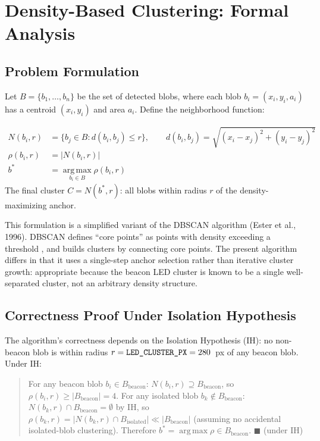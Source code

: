 \section{Density-Based Clustering: Formal Analysis}

\subsection{Problem Formulation}

Let $B=\{b_1,\dots,b_n\}$ be the set of detected blobs, where each blob $b_i=(x_i,y_i,a_i)$ has a centroid $(x_i,y_i)$ and area $a_i$. Define the neighborhood function:

\begin{eqblock}
\begin{align}
N(b_i, r) &= \{ b_j \in B : d(b_i, b_j) \leq r \}, \qquad d(b_i,b_j) = \sqrt{(x_i-x_j)^2+(y_i-y_j)^2} \\
\rho(b_i, r) &= |N(b_i, r)| \\
b^* &= \operatorname*{arg\,max}_{b_i \in B} \rho(b_i, r)
\end{align}
The final cluster $C = N(b^*, r)$: all blobs within radius $r$ of the density-maximizing anchor.
\end{eqblock}

This formulation is a simplified variant of the DBSCAN algorithm (Ester et al., 1996). DBSCAN defines ``core points'' as points with density exceeding a threshold , and builds clusters by connecting core points. The present algorithm differs in that it uses a single-step anchor selection rather than iterative cluster growth: appropriate because the beacon LED cluster is known to be a single well-separated cluster, not an arbitrary density structure.

\subsection{Correctness Proof Under Isolation Hypothesis}

The algorithm's correctness depends on the Isolation Hypothesis (IH): no non-beacon blob is within radius $r = \code{LED\_CLUSTER\_PX} = 280$~px of any beacon blob. Under IH:

\begin{quote}
For any beacon blob $b_i \in B_{\text{beacon}}$: $N(b_i,r) \supseteq B_{\text{beacon}}$, so $\rho(b_i,r) \geq |B_{\text{beacon}}| = 4$. For any isolated blob $b_k \notin B_{\text{beacon}}$: $N(b_k,r)\cap B_{\text{beacon}} = \emptyset$ by IH, so $\rho(b_k,r) = |N(b_k,r)\cap B_{\text{isolated}}| \ll |B_{\text{beacon}}|$ (assuming no accidental isolated-blob clustering). Therefore $b^* = \operatorname*{arg\,max}\rho \in B_{\text{beacon}}$. $\blacksquare$ (under IH)
\end{quote}


